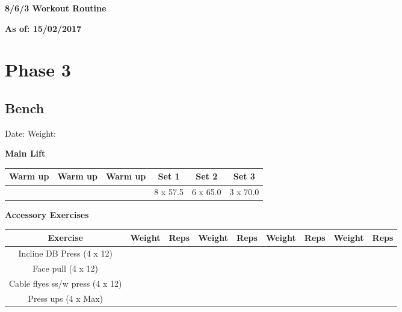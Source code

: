 \documentclass{article}%
\begin{document}
%
\normalsize%
\pagestyle{header}%
\linebreak%
\begin{Large}%
\textbf{8/6/3 Workout Routine}%
\end{Large}%
\linebreak%
\begin{large}%
\textbf{As of: 15/02/2017}%
\end{large}%
\linebreak%
\section*{Phase 3}%
\subsection*{Bench}%
Date: %
\linebreak%
Weight: %
\vspace*{20pt}%
\linebreak%
\begin{minipage}{0.5\textwidth}%
\textbf{Main Lift\newline%
\newline%
}%
\begin{tabular}{|c|c|c|c|c|c|}%
\hline%
Warm up&Warm up&Warm up&Set 1&Set 2&Set 3\\%
\hline%
&&&8 x 57.5&6 x 65.0&3 x 70.0\\%
\hline%
\end{tabular}%
\vspace*{20pt}%
\linebreak%
\textbf{Accessory Exercises\newline%
\newline%
}%
\begin{tabular}{|c|c|c|c|c|c|c|c|c|}%
\hline%
Exercise&Weight&Reps&Weight&Reps&Weight&Reps&Weight&Reps\\%
\hline%
Incline DB Press (4 x 12)&&&&&&&&\\%
\hline%
Face pull (4 x 12)&&&&&&&&\\%
\hline%
Cable flyes ss/w press (4 x 12)&&&&&&&&\\%
\hline%
Press ups (4 x Max)&&&&&&&&\\%
\hline%
\end{tabular}%
\end{minipage}%
\vspace*{20pt}%
\linebreak

%
\end{document}
